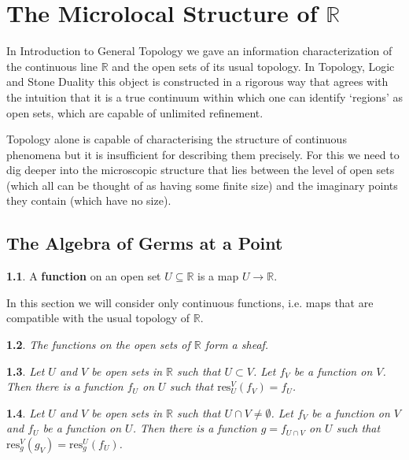 \documentclass[oneside,english]{amsbook}
\numberwithin{section}{chapter}
\theoremstyle{plain}
\newtheorem{thm}{\protect\theoremname}
\theoremstyle{definition}
\newtheorem{defn}[thm]{\protect\definitionname}
\providecommand{\definitionname}{Definition}
\providecommand{\theoremname}{Theorem}
\begin{document}
	
	\chapter{The Microlocal Structure of $\mathbb{R}$}
	
		In Introduction to General Topology we gave an information characterization of the continuous line $\mathbb{R}$ and the open sets of its usual topology. In Topology, Logic and Stone Duality this object is constructed in a rigorous way that agrees with the intuition that it is a true continuum within which one can identify `regions' as open sets, which are capable of unlimited refinement.
		
		Topology alone is capable of characterising the structure of continuous phenomena but it is insufficient for describing them precisely. For this we need to dig deeper into the microscopic structure that lies between the level of open sets (which all can be thought of as having some finite size) and the imaginary points they contain (which have no size). 
		
		\section{The Algebra of Germs at a Point}
		
			\begin{defn}
				A \textbf{function} on an open set $U\subseteq \mathbb{R}$ is a map $U\to \mathbb{R}$.
			\end{defn}
			
			In this section we will consider only continuous functions, i.e. maps that are compatible with the usual topology of $\mathbb{R}$.
		
			\begin{thm}
				The functions on the open sets of $\mathbb{R}$ form a sheaf.
			\end{thm}

			\begin{thm}
				Let $U$ and $V$ be open sets in $\mathbb{R}$ such that $U\subset V$. Let $f_V$ be a function on $V$. Then there is a function $f_U$ on $U$ such that $\text{res}^V_U(f_V) = f_U$.  
			\end{thm}
			
			\begin{thm}
				Let $U$ and $V$ be open sets in $\mathbb{R}$ such that $U \cap V\ne\emptyset $. Let $f_V$ be a function on $V$ and $f_U$ be a function on $U$. Then there is a function $g = f_{U\cap V}$ on $U$ such that $\text{res}^V_g(g_V) = \text{res}^U_g(f_U)$.
			\end{thm}
			
\end{document}
